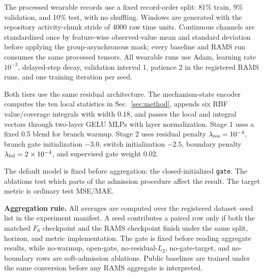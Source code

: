 ﻿\documentclass[10pt,conference]{IEEEtran}
\newcommand{\method}{\textnormal{\mbox{RAMS}}}
\begin{document}
The processed wearable records use a fixed record-order split: 81\% train,
9\% validation, and 10\% test, with no shuffling.  Windows are generated with
the repository activity-chunk stride of 4000 raw time units.  Continuous
channels are standardized once by feature-wise observed-value mean and standard
deviation before applying the group-asynchronous mask; every baseline and
\method{} run consumes the same processed tensors.  All wearable runs use Adam,
learning rate \(10^{-3}\), delayed-step decay, validation interval 1, patience
2 in the registered RAMS runs, and one training iteration per seed.

Both tiers use the same residual architecture.  The mechanism-state encoder
computes the ten local statistics in Sec.~\ref{sec:method}, appends six RBF
value/coverage integrals with width 0.18, and passes the local and integral
vectors through two-layer GELU MLPs with layer normalization.  Stage 1 uses a
fixed 0.5 blend for branch warmup.  Stage 2 uses residual penalty
\(\lambda_{\rm res}=10^{-4}\), branch gate initialization \(-3.0\), switch
initialization \(-2.5\), boundary penalty
\(\lambda_{\rm bd}=2\times10^{-4}\), and supervised gate weight \(0.02\).

The default model is fixed before aggregation: the closed-initialized
\texttt{gate}.  The ablations test which parts of the admission procedure affect
the result.  The target metric is ordinary test MSE/MAE.

\textbf{Aggregation rule.}
All averages are computed over the registered dataset--seed list in the
experiment manifest.  A seed contributes a paired row only if both the matched
\(F_0\) checkpoint and the \method{} checkpoint finish under the same split,
horizon, and metric implementation.  The gate is fixed before reading aggregate
results, while
no-warmup, open-gate, no-residual-\(L_2\), no-gate-target, and no-boundary
rows are soft-admission ablations.  Public baselines are trained under the
same conversion before any \method{} aggregate is interpreted.
\end{document}

